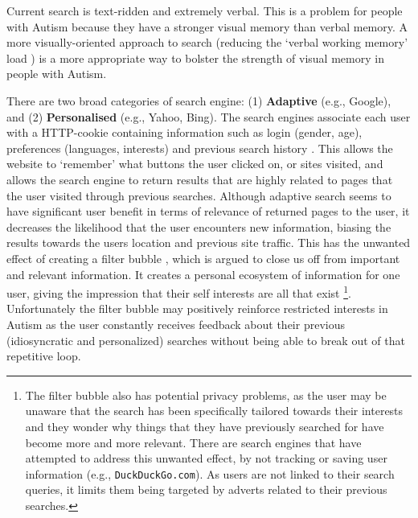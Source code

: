 \documentclass[a4paper, 11pt]{article}
\begin{document}
\begin{justify}
Current search is text-ridden and extremely verbal. This is a problem for people with Autism because they have a stronger visual memory \cite{fabienne} than verbal memory. A more visually-oriented approach to search (reducing the `verbal working memory' load \cite{workingmem}) is a more appropriate way to bolster the strength of visual memory in people with Autism.

There are two broad categories of search engine: (1) \textbf{Adaptive} (e.g., Google), and (2) \textbf{Personalised} (e.g., Yahoo, Bing). The search engines associate each user with a HTTP-cookie containing information such as login (gender, age), preferences (languages, interests) and previous search history \cite{googlepersonalised, yahooadaptive, bingadaptive}. This allows the website to ‘remember’ what buttons the user clicked on, or sites visited, and allows the search engine to return results that are highly related to pages that the user visited through previous searches. Although adaptive search seems to have significant user benefit in terms of relevance of returned pages to the user, it decreases the likelihood that the user encounters new information, biasing the results towards the users location and previous site traffic.  This has the unwanted effect of creating a filter bubble \cite{Pariser}, which is argued to close us off from important and relevant information. It creates a personal ecosystem of information for one user, giving the impression that their self interests are all that exist \footnote{The filter bubble also has potential privacy problems, as the user may be unaware that the search has been specifically tailored towards their interests and they wonder why things that they have previously searched for have become more and more relevant. There are search engines that have attempted to address this unwanted effect, by not tracking or saving user information (e.g., \texttt{DuckDuckGo.com}). As users are not linked to their search queries, it limits them being targeted by adverts related to their previous searches.}. Unfortunately the filter bubble may positively reinforce restricted interests in Autism as the user constantly receives feedback about their previous (idiosyncratic and personalized) searches without being able to break out of that repetitive loop. 


\end{justify}
\end{document}

